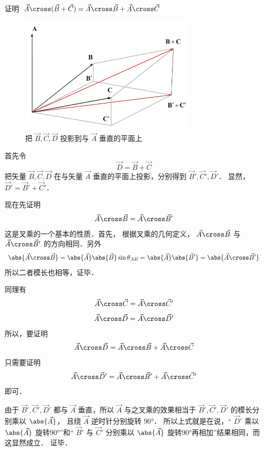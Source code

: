 
证明 $\vec A \cross (\vec B + \vec C) = \vec A \cross \vec B + \vec A \cross \vec C$ 
\begin{figure}[ht]
\vskip-10pt
\centering
\includegraphics[width=8.5cm]{./figures/CrossP.pdf}
\caption{把 $\vec B,\vec C,\vec D$ 投影到与 $\vec A$ 垂直的平面上}
\end{figure}
首先令
\begin{equation}
\vec D = \vec B + \vec C
\end{equation}
把矢量 $\vec B,\vec C,\vec D$ 在与矢量 $\vec A$ 垂直的平面上投影，分别得到 $\vec B',\vec C',\vec D'$． 显然，$\vec D'=\vec B'+\vec C'$． 

现在先证明
\begin{equation}
\vec A \cross \vec B = \vec A \cross \vec B'
\end{equation} 
这是叉乘的一个基本的性质．首先，
根据叉乘的几何定义， $\vec A \cross \vec B$ 与
 $\vec A \cross \vec B'$ 的方向相同．另外
\begin{equation}
\abs{\vec A \cross \vec B}  = \abs{\vec A} \abs{\vec B} \sin{\theta _{AB}} = \abs{\vec A} \abs{\vec B'}=\abs{\vec A \cross \vec B'}
\end{equation}
所以二者模长也相等，证毕．

同理有 
\begin{equation}
\vec A \cross \vec C = \vec A \cross \vec C'
\end{equation}
\begin{equation}
\vec A \cross \vec D = \vec A \cross \vec D'
\end{equation}
所以，要证明
\begin{equation}
\vec A \cross \vec D = \vec A \cross \vec B + \vec A \cross \vec C
\end{equation}
只需要证明
\begin{equation}
\vec A \cross \vec D' = \vec A \cross \vec B' + \vec A \cross \vec C'
\end{equation}
即可．

由于 $\vec B', \vec C', \vec D'$ 都与 $\vec A$ 垂直，所以 $\vec A$ 与之叉乘的效果相当于 $\vec B', \vec C', \vec D'$ 的模长分别乘以 $\abs {\vec A}$， 且绕 $\vec A$ 逆时针分别旋转 $90°$． 所以上式就是在说，“ $\vec D'$ 乘以 $\abs{\vec A} $ 旋转90°”和“ $\vec B'$ 与 $\vec C'$ 分别乘以 $\abs{\vec A}$ 旋转90°再相加”结果相同，而这显然成立． 证毕．




















